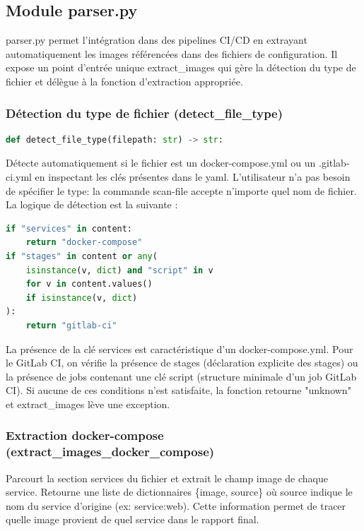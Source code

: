 \subsection{Module parser.py}
parser.py permet l'intégration dans des pipelines CI/CD en extrayant automatiquement les images référencées dans des fichiers de configuration. Il expose un point d'entrée unique extract\_images qui gère la détection du type de fichier et délègue à la fonction d'extraction appropriée. \\
\subsubsection{Détection du type de fichier (detect\_file\_type)}
\begin{lstlisting}[language=python, caption=Détection du type de fichier]
    def detect_file_type(filepath: str) -> str:
\end{lstlisting}
Détecte automatiquement si le fichier est un docker-compose.yml ou un .gitlab-ci.yml en inspectant les clés présentes dans le yaml. L'utilisateur n'a pas besoin de spécifier le type: la commande scan-file accepte n'importe quel nom de fichier. \\

La logique de détection est la suivante :

\begin{lstlisting}[language=python, caption=Logique de détection]
    if "services" in content:
    return "docker-compose"
if "stages" in content or any(
    isinstance(v, dict) and "script" in v
    for v in content.values()
    if isinstance(v, dict)
):
    return "gitlab-ci"
\end{lstlisting}
La présence de la clé services est caractéristique d'un docker-compose.yml. Pour le GitLab CI, on vérifie la présence de stages (déclaration explicite des stages) ou la présence de jobs contenant une clé script (structure minimale d'un job GitLab CI). Si aucune de ces conditions n'est satisfaite, la fonction retourne "unknown" et extract\_images lève une exception. \\

\subsubsection{Extraction docker-compose (extract\_images\_docker\_compose)}
Parcourt la section services du fichier et extrait le champ image de chaque service. Retourne une liste de dictionnaires \{image, source\} où source indique le nom du service d'origine (ex: service:web). Cette information permet de tracer quelle image provient de quel service dans le rapport final. \\

